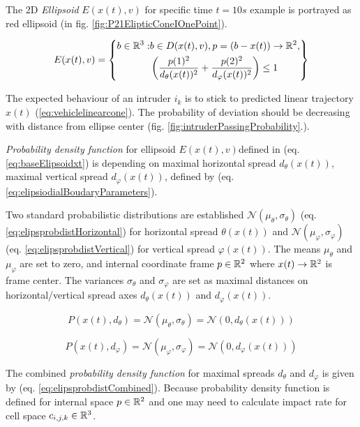 The 2D \emph{Ellipsoid} $E({x}(t),{v})$ for specific time $t=10s$ example is portrayed  as red ellipsoid (in fig. \ref{fig:P21ElipticConeIOnePoint}).

\begin{equation}\label{eq:baseElipsoidxt}
    E({x}(t),{v})=\left\{ \begin{aligned}{b}\in\mathbb{R}^3:&{b}\in D({x}(t),{v}),{p}=({b}-{x}(t))\to\mathbb{R}^2,\\&\left(\frac{p(1)^2} {d_\theta({x}(t))^2}+ \frac{p(2)^2}{d_\varphi({x}(t))^2}\right)\le 1\end{aligned}\right\}
\end{equation}

\noindent The expected behaviour of an intruder $i_k$ is to stick to predicted linear trajectory ${x}(t)$ (\ref{eq:vehiclelinearcone}). The probability of deviation should be decreasing with distance from ellipse center (fig. \ref{fig:intruderPassingProbability}.).  


\noindent \emph{Probability density function} for ellipsoid  $E({x}(t),{v})$defined in (eq. \ref{eq:baseElipsoidxt}) is depending on maximal horizontal spread $d_\theta({x}(t))$, maximal vertical spread $d_\varphi({x}(t))$, defined by (eq. \ref{eq:elipsiodialBoudaryParameters}). 

Two standard probabilistic distributions are established $\mathscr{N}(\mu_\theta,\sigma_\theta)$ (eq. \ref{eq:elipsprobdistHorizontal}) for horizontal spread $\theta({x}(t))$ and $\mathscr{N}(\mu_\varphi,\sigma_\varphi)$  (eq. \ref{eq:elipsprobdistVertical}) for vertical spread $\varphi({x}(t))$. The means $\mu_\theta$ and $\mu_\varphi$ are set to zero, and internal coordinate frame ${p}\in\mathbb{R}^2$ where ${x}(t)\to\mathbb{R}^2$ is frame center. The variances $\sigma_\theta$ and $\sigma_\varphi$ are set as maximal distances on horizontal/vertical spread axes $d_\theta({x}(t))$ and $d_\varphi({x}(t))$.

\begin{equation}\label{eq:elipsprobdistHorizontal}
    P({x}(t),d_\theta)=\mathscr{N}(\mu_\theta,\sigma_\theta)=\mathscr{N}(0,d_\theta({x}(t)))
\end{equation}

\begin{equation}\label{eq:elipsprobdistVertical}
    P({x}(t),d_\varphi)=\mathscr{N}(\mu_\varphi,\sigma_\varphi)=\mathscr{N}(0,d_\varphi({x}(t)))
\end{equation}

\noindent The combined \emph{probability density function} for maximal spreads $d_\theta$ and $d_\varphi$ is given by (eq. \ref{eq:elipsprobdistCombined}). Because probability density function is defined for internal space ${p}\in\mathbb{R}^2$ and one may need to calculate impact rate for  cell space $c_{i,j,k}\in\mathbb{R}^3$. 

